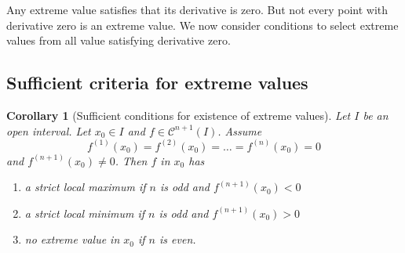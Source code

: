 \documentclass{article}
\newtheorem*{corollary}{Corollary}%
\begin{document}
Any extreme value satisfies that its derivative is zero. But not every point with derivative zero is an extreme value.
We now consider conditions to select extreme values from all value satisfying derivative zero.

\subsection{Sufficient criteria for extreme values}

\begin{corollary}[Sufficient conditions for existence of extreme values]
  Let $I$ be an open interval. Let $x_0 \in I$ and $f \in \mathcal C^{n+1}(I)$. Assume
  \[ f^{(1)}(x_0) = f^{(2)}(x_0) = \dots = f^{(n)}(x_0) = 0 \]
  and $f^{(n+1)}(x_0) \neq 0$. Then $f$ in $x_0$ has
  \begin{enumerate}
    \item a strict local maximum if $n$ is odd and $f^{(n+1)}(x_0) < 0$
    \item a strict local minimum if $n$ is odd and $f^{(n+1)}(x_0) > 0$
    \item no extreme value in $x_0$ if $n$ is even.
  \end{enumerate}
\end{corollary}
\end{document}
